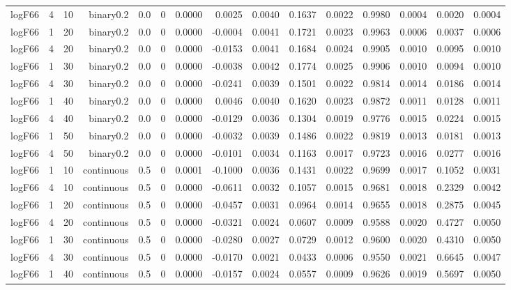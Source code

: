 \begin{longtable}{rrrrrrrrrrrrrrr}
  logF66 & 4 & 10 & binary0.2 & 0.0 & 0 & 0.0000 & 0.0025 & 0.0040 & 0.1637 & 0.0022 & 0.9980 & 0.0004 & 0.0020 & 0.0004 \\ 
  logF66 & 1 & 20 & binary0.2 & 0.0 & 0 & 0.0000 & -0.0004 & 0.0041 & 0.1721 & 0.0023 & 0.9963 & 0.0006 & 0.0037 & 0.0006 \\ 
  logF66 & 4 & 20 & binary0.2 & 0.0 & 0 & 0.0000 & -0.0153 & 0.0041 & 0.1684 & 0.0024 & 0.9905 & 0.0010 & 0.0095 & 0.0010 \\ 
  logF66 & 1 & 30 & binary0.2 & 0.0 & 0 & 0.0000 & -0.0038 & 0.0042 & 0.1774 & 0.0025 & 0.9906 & 0.0010 & 0.0094 & 0.0010 \\ 
  logF66 & 4 & 30 & binary0.2 & 0.0 & 0 & 0.0000 & -0.0241 & 0.0039 & 0.1501 & 0.0022 & 0.9814 & 0.0014 & 0.0186 & 0.0014 \\ 
  logF66 & 1 & 40 & binary0.2 & 0.0 & 0 & 0.0000 & 0.0046 & 0.0040 & 0.1620 & 0.0023 & 0.9872 & 0.0011 & 0.0128 & 0.0011 \\ 
  logF66 & 4 & 40 & binary0.2 & 0.0 & 0 & 0.0000 & -0.0129 & 0.0036 & 0.1304 & 0.0019 & 0.9776 & 0.0015 & 0.0224 & 0.0015 \\ 
  logF66 & 1 & 50 & binary0.2 & 0.0 & 0 & 0.0000 & -0.0032 & 0.0039 & 0.1486 & 0.0022 & 0.9819 & 0.0013 & 0.0181 & 0.0013 \\ 
  logF66 & 4 & 50 & binary0.2 & 0.0 & 0 & 0.0000 & -0.0101 & 0.0034 & 0.1163 & 0.0017 & 0.9723 & 0.0016 & 0.0277 & 0.0016 \\ 
  logF66 & 1 & 10 & continuous & 0.5 & 0 & 0.0001 & -0.1000 & 0.0036 & 0.1431 & 0.0022 & 0.9699 & 0.0017 & 0.1052 & 0.0031 \\ 
  logF66 & 4 & 10 & continuous & 0.5 & 0 & 0.0000 & -0.0611 & 0.0032 & 0.1057 & 0.0015 & 0.9681 & 0.0018 & 0.2329 & 0.0042 \\ 
  logF66 & 1 & 20 & continuous & 0.5 & 0 & 0.0000 & -0.0457 & 0.0031 & 0.0964 & 0.0014 & 0.9655 & 0.0018 & 0.2875 & 0.0045 \\ 
  logF66 & 4 & 20 & continuous & 0.5 & 0 & 0.0000 & -0.0321 & 0.0024 & 0.0607 & 0.0009 & 0.9588 & 0.0020 & 0.4727 & 0.0050 \\ 
  logF66 & 1 & 30 & continuous & 0.5 & 0 & 0.0000 & -0.0280 & 0.0027 & 0.0729 & 0.0012 & 0.9600 & 0.0020 & 0.4310 & 0.0050 \\ 
  logF66 & 4 & 30 & continuous & 0.5 & 0 & 0.0000 & -0.0170 & 0.0021 & 0.0433 & 0.0006 & 0.9550 & 0.0021 & 0.6645 & 0.0047 \\ 
  logF66 & 1 & 40 & continuous & 0.5 & 0 & 0.0000 & -0.0157 & 0.0024 & 0.0557 & 0.0009 & 0.9626 & 0.0019 & 0.5697 & 0.0050 \\ 

\end{longtable}
